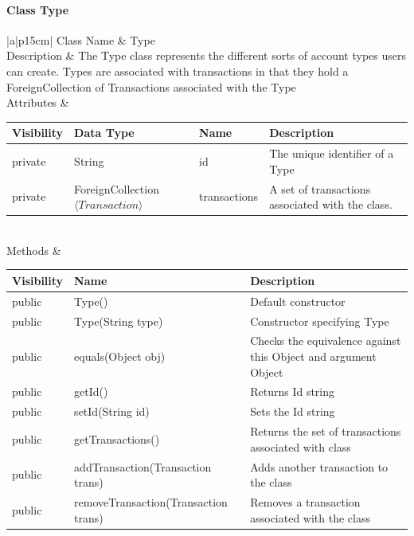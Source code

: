 \documentclass[12pt]{article}
\begin{document}
\paragraph{Class Type}
\begin{table}[H]
	\begin{tabular}{|a|p{15cm}|}
		\hline
		{Class Name} & {Type} \\
		\hline
		Description & The Type class represents the different sorts of account types users can create. Types are associated with transactions in that they hold a ForeignCollection of Transactions associated with the Type\\
		\hline
		Attributes & 
		\begin{tabular}{| p{1.8cm} | p{2.25cm} | p{6.4cm} | p{3.0cm} |}
			\rowcolor{lightgray}
			Visibility & Data Type & Name & Description \\
			\hline
			\rowcolor{white}
			private & String & id & The unique identifier of a Type \\
			\hline
			private & ForeignCollection$\langle Transaction \rangle$ & transactions & A set of transactions associated with the class. \\
			\hline		
		\end{tabular} \\
		\hline
		Methods & 		 
		\begin{tabular}{| p{2cm} | p{5cm} | p{6.9cm} |}
			\hline
			\rowcolor{gray}
			{Visibility} &{Name} & {Description} \\
			\hline
			\rowcolor{white}			
			public & Type() & Default constructor\\
			\hline
			public &  Type(String type) & Constructor specifying Type\\
			\hline
			public &  equals(Object obj) & Checks the equivalence against this Object and argument Object\\
			\hline
			public &  getId() & Returns Id string\\
			\hline
			public &  setId(String id) &  Sets the Id string\\
			\hline
			public &  getTransactions() & Returns the set of transactions associated with class\\
			\hline
			public &  addTransaction(Transaction trans) & Adds another transaction to the class\\
			\hline
			public &  removeTransaction(Transaction trans) & Removes a transaction associated with the class\\
			\hline		
		\end{tabular}								 
	\end{tabular}
\end{table}
\end{document}
